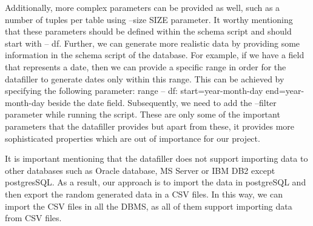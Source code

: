 Additionally, more complex parameters can be provided as well, such as a number of tuples per table using --size SIZE parameter. It worthy mentioning that these parameters should be defined within the schema script and should start with -- df.  Further, we can generate more realistic data by providing some information in the schema script of the database. For example, if we have a field that represents a date, then we can provide a specific range in order for the datafiller to generate dates only within this range. This can be achieved by specifying the following parameter: range -- df: start=year-month-day end=year-month-day beside the date field. Subsequently, we need to add the --filter parameter while running the script. These are only some of the important parameters that the datafiller provides but apart from these, it provides more sophisticated properties which are out of importance for our project.

It is important mentioning that the datafiller does not support importing data to other databases such as Oracle database, MS Server or IBM DB2 except postgresSQL. As a result, our approach is to import the data in postgreSQL and then export the random generated data in a CSV files. In this way, we can import the CSV files in all the DBMS, as all of them support importing data from CSV files.  

